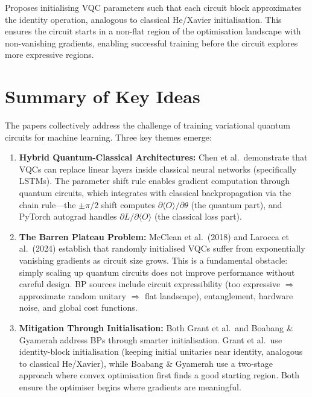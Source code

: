 \documentclass[10pt,twocolumn]{article}
\begin{document}
Proposes initialising VQC parameters such that each circuit block approximates the identity operation, analogous to classical He/Xavier initialisation. This ensures the circuit starts in a non-flat region of the optimisation landscape with non-vanishing gradients, enabling successful training before the circuit explores more expressive regions.


\section{Summary of Key Ideas}

The papers collectively address the challenge of training variational quantum circuits for machine learning. Three key themes emerge:

\begin{enumerate}
  \item \textbf{Hybrid Quantum-Classical Architectures:} Chen et al.\ demonstrate that VQCs can replace linear layers inside classical neural networks (specifically LSTMs). The parameter shift rule enables gradient computation through quantum circuits, which integrates with classical backpropagation via the chain rule---the $\pm\pi/2$ shift computes $\partial\langle O\rangle/\partial\theta$ (the quantum part), and PyTorch autograd handles $\partial L/\partial\langle O\rangle$ (the classical loss part).

  \item \textbf{The Barren Plateau Problem:} McClean et al.\ (2018) and Larocca et al.\ (2024) establish that randomly initialised VQCs suffer from exponentially vanishing gradients as circuit size grows. This is a fundamental obstacle: simply scaling up quantum circuits does not improve performance without careful design. BP sources include circuit expressibility (too expressive $\Rightarrow$ approximate random unitary $\Rightarrow$ flat landscape), entanglement, hardware noise, and global cost functions.

  \item \textbf{Mitigation Through Initialisation:} Both Grant et al.\ and Boabang \& Gyamerah address BPs through smarter initialisation. Grant et al.\ use identity-block initialisation (keeping initial unitaries near identity, analogous to classical He/Xavier), while Boabang \& Gyamerah use a two-stage approach where convex optimisation first finds a good starting region. Both ensure the optimiser begins where gradients are meaningful.
\end{enumerate}
\end{document}
